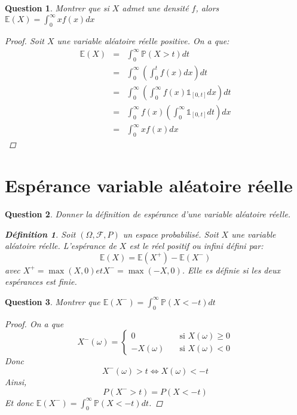 \documentclass{article}
\theoremstyle{plain}
\newtheorem{question}{Question}
\theoremstyle{definition}
\newtheorem{definition}{Définition}
\begin{document}
\begin{question}
	Montrer que si $X$ admet une densité $f$, alors $\mathbb{E} (X) = \int_0^{\infty} x f(x) dx$
	\begin{proof}
		Soit $X$ une variable aléatoire réelle positive. On a que:
		\begin{eqnarray*}
			\mathbb{E} (X) &=& \int_0^{\infty} \mathbb{P} (X > t) dt \\
			&=& \int_0^{\infty} \left( \int_0^{t} f(x) dx \right) dt \\
			&=& \int_0^{\infty} \left( \int_0^{\infty} f(x) \mathds{1}_{[0, t]} dx \right) dt \\
			&=& \int_0^{\infty} f(x) \left( \int_0^{\infty} \mathds{1}_{[0, t]} dt \right) dx \\
			&=& \int_0^{\infty} x f(x) dx
		\end{eqnarray*}
	\end{proof}

\end{question}

\section{Espérance variable aléatoire réelle}

\begin{question}
	Donner la définition de espérance d'une variable aléatoire réelle.
	\begin{definition}
		Soit $(\Omega, \mathscr{F}, P)$ un espace probabilisé. Soit $X$ une variable aléatoire réelle. L'espérance de $X$ est le réel positif ou infini défini par:
		\begin{equation*}
			\mathbb{E} (X) = \mathbb{E} (X^+) - \mathbb{E} (X^-)
		\end{equation*}
		avec $X^+ = \max(X, 0) et X^- = \max(-X, 0)$. Elle es définie si les deux espérances est finie.
	\end{definition}
\end{question}

\begin{question}
	Montrer que $\mathbb{E} (X^-) = \int_0^{\infty} \mathbb{P} (X < -t) dt$
	\begin{proof}
		On a que
		\begin{equation*}
			X^-(\omega) = \left\{
			\begin{aligned}
				0          & \quad \text{si $X(\omega) \geq 0$} \\
				-X(\omega) & \quad \text{si $X(\omega) < 0$}
			\end{aligned}
			\right.
		\end{equation*}
		Donc
		\[X^-(\omega) > t \iff X(\omega) < -t\]
		Ainsi,
		\[P(X^- > t) = P(X < -t)\]
		Et donc $\mathbb{E} (X^-) = \int_0^{\infty} \mathbb{P} (X < -t) dt$.
	\end{proof}
\end{question}
\end{document}
